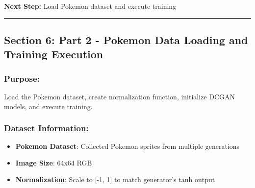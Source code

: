 \documentclass[11pt]{article}
\providecommand{\tightlist}{%
      \setlength{\itemsep}{0pt}\setlength{\parskip}{0pt}}
\begin{document}
\textbf{Next Step:} Load Pokemon dataset and execute training

    \begin{center}\rule{0.5\linewidth}{0.5pt}\end{center}

\subsection{Section 6: Part 2 - Pokemon Data Loading and Training
Execution}\label{section-6-part-2---pokemon-data-loading-and-training-execution}

\subsubsection{Purpose:}\label{purpose}

Load the Pokemon dataset, create normalization function, initialize
DCGAN models, and execute training.

\subsubsection{Dataset Information:}\label{dataset-information}

\begin{itemize}
\tightlist
\item
  \textbf{Pokemon Dataset}: Collected Pokemon sprites from multiple
  generations
\item
  \textbf{Image Size}: 64x64 RGB
\item
  \textbf{Normalization}: Scale to {[}-1, 1{]} to match generator's tanh
  output
\end{itemize}
\end{document}
